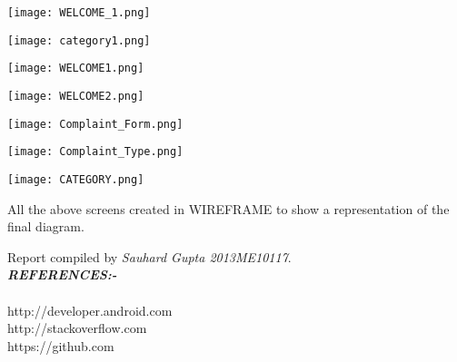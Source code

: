 \documentclass{article}
\begin{document}
\begin{itemize}
\begin{enumerate}
            \begin{minipage}{\linewidth}
	        \centering
	        \texttt{[image: WELCOME\_1.png]}
            \end{minipage}
            \newpage
            \begin{minipage}{\linewidth}
	        \centering
	        \texttt{[image: category1.png]}
            \end{minipage}
            \newpage
            \begin{minipage}{\linewidth}
	        \centering
	        \texttt{[image: WELCOME1.png]}
            \end{minipage}
            \newpage
            \begin{minipage}{\linewidth}
	        \centering
	        \texttt{[image: WELCOME2.png]}
            \end{minipage}
            \newpage
            \begin{minipage}{\linewidth}
	        \centering
	        \texttt{[image: Complaint\_Form.png]}
            \end{minipage}
            \newpage
            \begin{minipage}{\linewidth}
	        \centering
	        \texttt{[image: Complaint\_Type.png]}
            \end{minipage}
            \newpage
            \begin{minipage}{\linewidth}
	        \centering
	        \texttt{[image: CATEGORY.png]}
            \end{minipage}
            
            


All the above screens created in WIREFRAME to show a representation of the final diagram.
\end{enumerate}
        


\end{itemize}

Report compiled by {\em Sauhard Gupta 2013ME10117}.
\newpage
\\
\textbf{\textit{REFERENCES:-}}\\
\\
http://developer.android.com \\
http://stackoverflow.com    \\
https://github.com          \\
\end{document}
